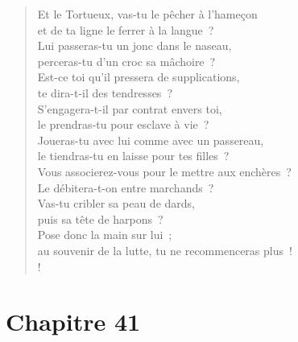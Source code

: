 \documentclass[french,twoside]{book} %
\newcommand\chapteropen{} %
\newcommand\chaptercont{} %
\newcommand\chapterclose{} %
\begin{document}
\begin{verse}
Et le Tortueux, vas-tu le pêcher à l’hameçon \\
et de ta ligne le ferrer à la langue ?\\
Lui passeras-tu un jonc dans le naseau, \\
perceras-tu d’un croc sa mâchoire ?\\
Est-ce toi qu’il pressera de supplications, \\
te dira-t-il des tendresses ?\\
S’engagera-t-il par contrat envers toi, \\
le prendras-tu pour esclave à vie ?\\
Joueras-tu avec lui comme avec un passereau, \\
le tiendras-tu en laisse pour tes filles ?\\
Vous associerez-vous pour le mettre aux enchères ? \\
Le débitera-t-on entre marchands ?\\
Vas-tu cribler sa peau de dards, \\
puis sa tête de harpons ?\\
Pose donc la main sur lui ; \\
au souvenir de la lutte, tu ne recommenceras plus !\\!
\end{verse}
\chapterclose


\chapteropen
\chapter[Chapitre 41]{Chapitre 41}\renewcommand{\leftmark}{Chapitre 41}


\chaptercont
\end{document}
